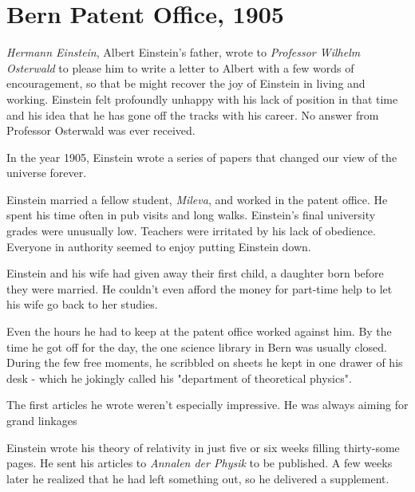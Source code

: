 %

\section{Bern Patent Office, 1905}

\emph{Hermann Einstein}, Albert Einstein's father, wrote to \emph{Professor Wilhelm Osterwald} to please him to write a letter to Albert with a few words of encouragement, so that be might recover the joy of Einstein in living and working. Einstein felt profoundly unhappy with his lack of position in that time and his idea that he has gone off the tracks with his career. No answer from Professor Osterwald was ever received.

In the year 1905, Einstein wrote a series of papers that changed our view of the universe forever.

Einstein married a fellow student, \emph{Mileva}, and worked in the patent office. He spent his time often in pub visits and long walks. Einstein's final university grades were unusually low. Teachers were irritated by his lack of obedience. Everyone in authority seemed to enjoy putting Einstein down.

Einstein and his wife had given away their first child, a daughter born before they were married. He couldn't even afford the money for part-time help to let his wife go back to her studies.

Even the hours he had to keep at the patent office worked against him. By the time he got off for the day, the one science library in Bern was usually closed. During the few free moments, he scribbled on sheets he kept in one drawer of his desk - which he jokingly called his "department of theoretical physics".

The first articles he wrote weren't especially impressive. He was always aiming for grand linkages

Einstein wrote his theory of relativity in just five or six weeks filling thirty-some pages. He sent his articles to \emph{Annalen der Physik} to be published. A few weeks later he realized that he had left something out, so he delivered a supplement.